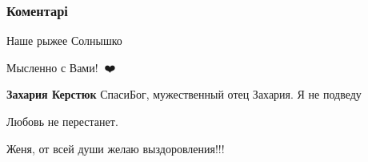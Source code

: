 
 
 
 
 
\subsubsection{Коментарі}

\begin{itemize}

 
Наше рыжее Солнышко

 
Мысленно с Вами!🙏🙏❤️

 
\textbf{Захария Керстюк} СпасиБог, мужественный отец Захария. Я не подведу


 
Любовь не перестанет.

 
Женя, от всей души желаю выздоровления!!!


\end{itemize}
